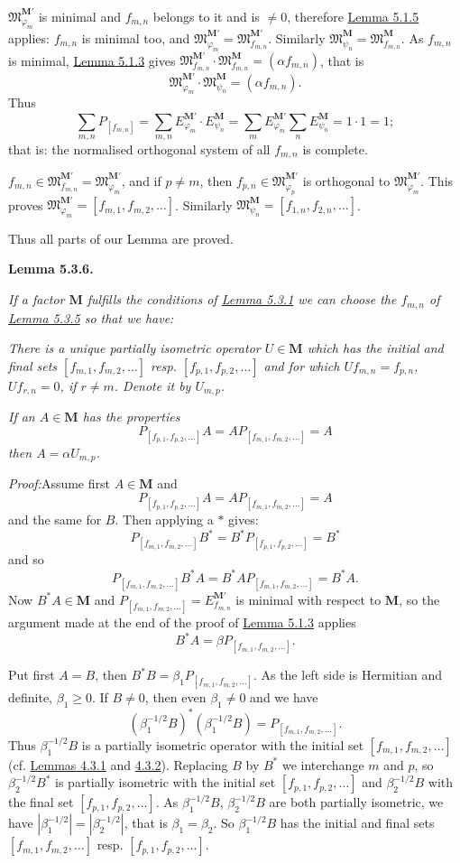 \documentclass[12pt,b5paper,twoside]{article}
\newcommand{\M}{\mathbf M}
\newcommand{\Lemma}[1]{%
  \par\smallskip\noindent\phantomsection\label{lem:#1}\textbf{Lemma #1.}\enspace
}
\newcommand{\Proof}{\par\noindent\textit{Proof:}\enspace}
\newcommand{\lemref}[1]{\hyperref[lem:#1]{Lemma #1}}
\begin{document}
$\mathfrak M_{\varphi_m}^{\M'}$ is minimal and $f_{m,n}$ belongs to it and is
$\neq0$, therefore \lemref{5.1.5} applies: $f_{m,n}$ is minimal too, and
$\mathfrak M_{\varphi_m}^{\M'}=\mathfrak M_{f_{m,n}}^{\M'}$. Similarly
$\mathfrak M_{\psi_n}^{\M}=\mathfrak M_{f_{m,n}}^{\M}$. As $f_{m,n}$ is
minimal, \lemref{5.1.3} gives
$\mathfrak M_{f_{m,n}}^{\M'}\cdot
\mathfrak M_{f_{m,n}}^{\M}=(\alpha f_{m,n})$, that is
\[
 \mathfrak M_{\varphi_m}^{\M'}\cdot
 \mathfrak M_{\psi_n}^{\M}=(\alpha f_{m,n}).
\]
Thus
\[
 \sum_{m,n}P_{[f_{m,n}]}
 =\sum_{m,n}E_{\varphi_m}^{\M'}\cdot E_{\psi_n}^{\M}
 =\sum_mE_{\varphi_m}^{\M'}\sum_nE_{\psi_n}^{\M}
 =1\cdot1=1;
\]
that is: the normalised orthogonal system of all $f_{m,n}$ is complete.

$f_{m,n}\in\mathfrak M_{f_{m,n}}^{\M'}
=\mathfrak M_{\varphi_m}^{\M'}$, and if $p\neq m$, then
$f_{p,n}\in\mathfrak M_{\varphi_p}^{\M'}$ is orthogonal to
$\mathfrak M_{\varphi_m}^{\M'}$. This proves
$\mathfrak M_{\varphi_m}^{\M'}=[f_{m,1},f_{m,2},\ldots]$. Similarly
$\mathfrak M_{\psi_n}^{\M}=[f_{1,n},f_{2,n},\ldots]$.

Thus all parts of our Lemma are proved.

\Lemma{5.3.6}
\emph{If a factor $\M$ fulfills the conditions of \lemref{5.3.1} we can
choose the $f_{m,n}$ of \lemref{5.3.5} so that we have:}

\emph{There is a unique partially isometric operator $U\in\M$ which has the
initial and final sets $[f_{m,1},f_{m,2},\ldots]$ resp.
$[f_{p,1},f_{p,2},\ldots]$ and for which $Uf_{m,n}=f_{p,n}$,
$Uf_{r,n}=0$, if $r\neq m$. Denote it by $U_{m,p}$.}

\emph{If an $A\in\M$ has the properties}
\[
 P_{[f_{p,1},f_{p,2},\ldots]}A
 =AP_{[f_{m,1},f_{m,2},\ldots]}=A
\]
\emph{then $A=\alpha U_{m,p}$.}

\Proof Assume first $A\in\M$ and
\[
 P_{[f_{p,1},f_{p,2},\ldots]}A
 =AP_{[f_{m,1},f_{m,2},\ldots]}=A
\]
and the same for $B$. Then applying a $*$ gives:
\[
 P_{[f_{m,1},f_{m,2},\ldots]}B^*
 =B^*P_{[f_{p,1},f_{p,2},\ldots]}=B^*
\]
and so
\[
 P_{[f_{m,1},f_{m,2},\ldots]}B^*A
 =B^*AP_{[f_{m,1},f_{m,2},\ldots]}=B^*A.
\]
Now $B^*A\in\M$ and
$P_{[f_{m,1},f_{m,2},\ldots]}=E_{f_{m,n}}^{\M'}$ is minimal with respect to
$\M$, so the argument made at the end of the proof of \lemref{5.1.3} applies
\[
 B^*A=\beta P_{[f_{m,1},f_{m,2},\ldots]}.
\]

Put first $A=B$, then
$B^*B=\beta_1P_{[f_{m,1},f_{m,2},\ldots]}$. As the left side is Hermitian
and definite, $\beta_1\geq0$. If $B\neq0$, then even $\beta_1\neq0$ and we
have
\[
 (\beta_1^{-1/2}B)^*(\beta_1^{-1/2}B)
 =P_{[f_{m,1},f_{m,2},\ldots]}.
\]
Thus $\beta_1^{-1/2}B$ is a partially isometric operator with the initial set
$[f_{m,1},f_{m,2},\ldots]$ (cf. \hyperref[lem:4.3.1]{Lemmas 4.3.1} and
\hyperref[lem:4.3.2]{4.3.2}). Replacing $B$ by $B^*$ we interchange $m$ and $p$, so
$\beta_2^{-1/2}B^*$ is partially isometric with the initial set
$[f_{p,1},f_{p,2},\ldots]$ and $\beta_2^{-1/2}B$ with the final set
$[f_{p,1},f_{p,2},\ldots]$. As $\beta_1^{-1/2}B$,
$\beta_2^{-1/2}B$ are both partially isometric, we have
$|\beta_1^{-1/2}|=|\beta_2^{-1/2}|$, that is $\beta_1=\beta_2$. So
$\beta_1^{-1/2}B$ has the initial and final sets
$[f_{m,1},f_{m,2},\ldots]$ resp. $[f_{p,1},f_{p,2},\ldots]$.
\end{document}
